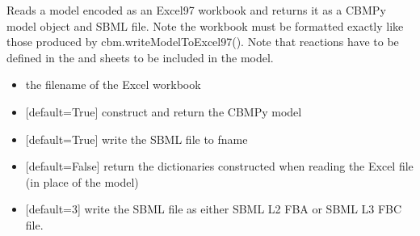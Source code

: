\documentclass[letterpaper,10pt,english]{sphinxmanual}
\begin{document}

\begin{fulllineitems}
\label{\detokenize{modules_doc:cbmpy.CBRead.readExcel97Model}}
\pysigstartsignatures
{}
\pysigstopsignatures
\sphinxAtStartPar
Reads a model encoded as an Excel97 workbook and returns it as a CBMPy model object and SBML file. Note the workbook must be formatted
exactly like those produced by cbm.writeModelToExcel97(). Note that reactions have to be defined in  the 
and  sheets to be included in the model.
\begin{itemize}
\item {} 
\sphinxAtStartPar
{} the filename of the Excel workbook

\item {} 
\sphinxAtStartPar
{} {[}default=True{]} construct and return the CBMPy model

\item {} 
\sphinxAtStartPar
{} {[}default=True{]} write the SBML file to fname

\item {} 
\sphinxAtStartPar
{} {[}default=False{]} return the dictionaries constructed when reading the Excel file (in place of the model)

\item {} 
\sphinxAtStartPar
{} {[}default=3{]} write the SBML file as either SBML L2 FBA or SBML L3 FBC file.

\end{itemize}

\end{fulllineitems}

\end{document}

